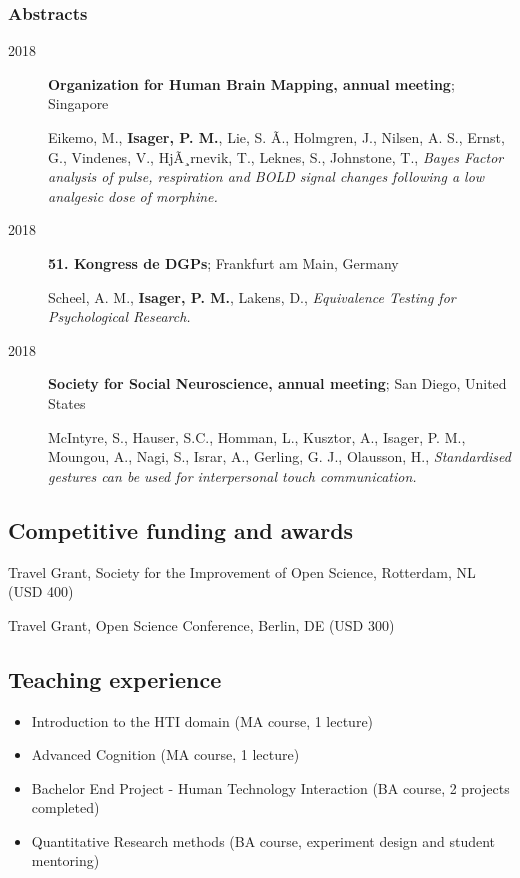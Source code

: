 \documentclass[]{article}
\providecommand{\tightlist}{%
  \setlength{\itemsep}{0pt}\setlength{\parskip}{0pt}}
\begin{document}
\subsubsection{Abstracts}\label{abstracts}

\begin{description}
\item[2018]
\textbf{Organization for Human Brain Mapping, annual meeting}; Singapore

Eikemo, M., \textbf{Isager, P. M.}, Lie, S. Ã., Holmgren, J., Nilsen,
A. S., Ernst, G., Vindenes, V., HjÃ¸rnevik, T., Leknes, S., Johnstone,
T., \emph{Bayes Factor analysis of pulse, respiration and BOLD signal
changes following a low analgesic dose of morphine.}
\item[2018]
\textbf{51. Kongress de DGPs}; Frankfurt am Main, Germany

Scheel, A. M., \textbf{Isager, P. M.}, Lakens, D., \emph{Equivalence
Testing for Psychological Research.}
\item[2018]
\textbf{Society for Social Neuroscience, annual meeting}; San Diego,
United States

McIntyre, S., Hauser, S.C., Homman, L., Kusztor, A., Isager, P. M.,
Moungou, A., Nagi, S., Israr, A., Gerling, G. J., Olausson, H.,
\emph{Standardised gestures can be used for interpersonal touch
communication.}
\end{description}

\subsection{Competitive funding and
awards}\label{competitive-funding-and-awards}

Travel Grant, Society for the Improvement of Open Science, Rotterdam, NL
(USD 400)

Travel Grant, Open Science Conference, Berlin, DE (USD 300)

\subsection{Teaching experience}\label{teaching-experience}

\begin{itemize}
\tightlist
\item
  Introduction to the HTI domain (MA course, 1 lecture)
\item
  Advanced Cognition (MA course, 1 lecture)
\item
  Bachelor End Project - Human Technology Interaction (BA course, 2
  projects completed)
\item
  Quantitative Research methods (BA course, experiment design and
  student mentoring)
\end{itemize}
\end{document}
